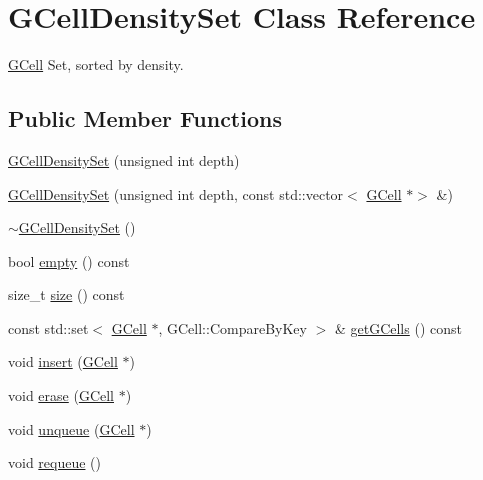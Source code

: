 \hypertarget{classKatabatic_1_1GCellDensitySet}{}\section{G\+Cell\+Density\+Set Class Reference}
\label{classKatabatic_1_1GCellDensitySet}


\mbox{\hyperlink{classKatabatic_1_1GCell}{G\+Cell}} Set, sorted by density.  


\subsection*{Public Member Functions}
\begin{DoxyCompactItemize}
\item 
\mbox{\hyperlink{classKatabatic_1_1GCellDensitySet_ad74cbb404ad28f734f5759462aa9f363}{G\+Cell\+Density\+Set}} (unsigned int depth)
\item 
\mbox{\hyperlink{classKatabatic_1_1GCellDensitySet_a5d97169315528fca978d5e65a3cc8130}{G\+Cell\+Density\+Set}} (unsigned int depth, const std\+::vector$<$ \mbox{\hyperlink{classKatabatic_1_1GCell}{G\+Cell}} $\ast$$>$ \&)
\item 
\mbox{\hyperlink{classKatabatic_1_1GCellDensitySet_aef015ff8dc7d34fcb907281f71bb0003}{$\sim$\+G\+Cell\+Density\+Set}} ()
\item 
bool \mbox{\hyperlink{classKatabatic_1_1GCellDensitySet_a644718bb2fb240de962dc3c9a1fdf0dc}{empty}} () const
\item 
size\+\_\+t \mbox{\hyperlink{classKatabatic_1_1GCellDensitySet_a259cb5a711406a8c3e5d937eb9350cca}{size}} () const
\item 
const std\+::set$<$ \mbox{\hyperlink{classKatabatic_1_1GCell}{G\+Cell}} $\ast$, G\+Cell\+::\+Compare\+By\+Key $>$ \& \mbox{\hyperlink{classKatabatic_1_1GCellDensitySet_a8bac89a45c1449ebdb28a778993cb8e5}{get\+G\+Cells}} () const
\item 
void \mbox{\hyperlink{classKatabatic_1_1GCellDensitySet_a6b97afb6d814ba80a24a49b3ad8e540b}{insert}} (\mbox{\hyperlink{classKatabatic_1_1GCell}{G\+Cell}} $\ast$)
\item 
void \mbox{\hyperlink{classKatabatic_1_1GCellDensitySet_a743f7f98fe31b8a1c134aff01ba03acb}{erase}} (\mbox{\hyperlink{classKatabatic_1_1GCell}{G\+Cell}} $\ast$)
\item 
void \mbox{\hyperlink{classKatabatic_1_1GCellDensitySet_a89099ec88eadcadb942b7d64a6ffd7ee}{unqueue}} (\mbox{\hyperlink{classKatabatic_1_1GCell}{G\+Cell}} $\ast$)
\item 
void \mbox{\hyperlink{classKatabatic_1_1GCellDensitySet_ac84efe46d8a3c409e85bc3420240c3c2}{requeue}} ()
\end{DoxyCompactItemize}


